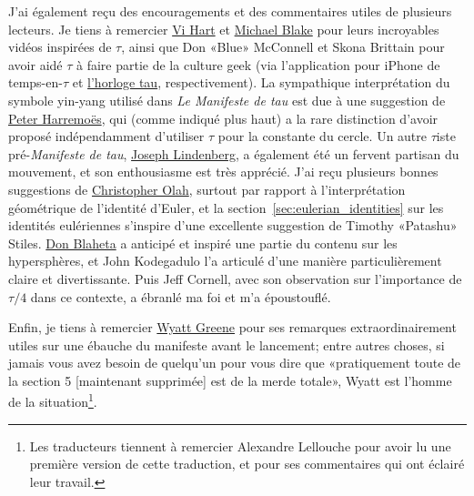 J'ai également reçu des encouragements et des commentaires utiles de plusieurs
lecteurs. Je tiens à remercier
\href{https://www.youtube.com/watch?v=jG7vhMMXagQ}{Vi Hart} et
\href{https://www.youtube.com/watch?v=3174T-3-59Q}{Michael Blake} pour leurs
incroyables vidéos inspirées de $\tau$, ainsi que Don «\ns Blue\ns » McConnell et
Skona Brittain pour avoir aidé $\tau$ à faire partie de la culture geek
(via l'application pour iPhone de temps-en-$\tau$
et
\href{https://translate.google.com/translate?hl=en&sl=en&tl=fr&u=http://www.sbcrafts.net/clocks/}{l'horloge
tau}, respectivement).
La sympathique interprétation du symbole yin-yang utilisé dans \emph{Le Manifeste de
tau} est due à une suggestion de
\href{https://translate.google.com/translate?hl=en&sl=en&tl=fr&u=http://www.harremoes.dk/Peter/}{Peter
Harremoës}, qui (comme indiqué plus haut) a la rare distinction d'avoir proposé
indépendamment d'utiliser $\tau$ pour la constante du cercle. Un autre $\tau$iste
pré-\emph{Manifeste de tau},
\href{https://translate.google.com/translate?hl=en&sl=en&tl=fr&u=https://sites.google.com/site/taubeforeitwascool/}{Joseph
Lindenberg}, a
également été un fervent partisan du mouvement, et son enthousiasme est très apprécié. J'ai
reçu plusieurs bonnes suggestions de
\href{https://translate.google.com/translate?hl=en&sl=en&tl=fr&u=https://christopherolah.wordpress.com/about-me}{Christopher
Olah}, surtout par rapport à l'interprétation géométrique de l'identité d'Euler, et la
section~\ref{sec:eulerian_identities} sur les identités eulériennes
s'inspire d'une excellente suggestion de Timothy «\ns Patashu\ns » Stiles.
\href{https://translate.google.com/translate?hl=en&sl=en&tl=fr&u=http://www.blahedo.org/blog/archives/001083.html}{Don
Blaheta} a anticipé
et inspiré une partie du contenu sur les hypersphères, et
John Kodegadulo l'a articulé d'une manière
particulièrement claire et divertissante. Puis Jeff Cornell, avec son
observation sur l'importance de $\tau/4$ dans ce contexte, a ébranlé ma foi et
m'a époustouflé.

Enfin, je tiens à remercier \href{https://techiferous.com/}{Wyatt Greene} pour
ses remarques extraordinairement utiles sur une ébauche du manifeste avant le
lancement\ns; entre autres choses, si jamais vous avez besoin de quelqu'un pour
vous dire que «\ns pratiquement toute de la section 5 [maintenant supprimée] est
de la merde totale\ns », Wyatt est l'homme de la situation\ns \footnote{Les
traducteurs tiennent à remercier Alexandre Lellouche pour avoir lu une première
version de cette traduction, et pour ses commentaires qui ont éclairé leur
travail.}.


